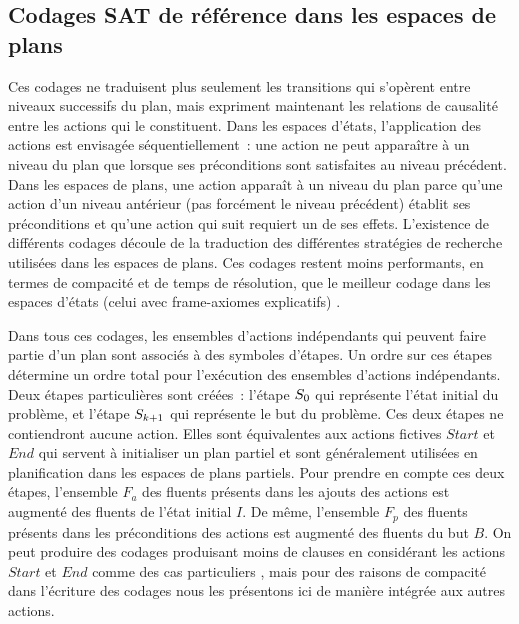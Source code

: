 %
%
\subsection{Codages SAT de référence dans les espaces de plans}


{\color{red}
Ces codages ne traduisent plus seulement les transitions qui s'opèrent entre niveaux successifs du plan, mais expriment maintenant les relations de causalité entre les actions qui le constituent. Dans les espaces d'états, l'application des actions est envisagée séquentiellement~: une action ne peut apparaître à un niveau du plan que lorsque ses préconditions sont satisfaites au niveau précédent.  Dans les espaces de plans, une action apparaît à un niveau du plan parce qu'une action d'un niveau antérieur (pas forcément le niveau précédent) établit ses préconditions et qu'une action qui suit requiert un de ses effets.
L'existence de différents codages découle de la traduction des différentes
stratégies de recherche utilisées dans les espaces de plans. Ces codages restent moins performants, en termes de compacité et de temps de résolution, que le meilleur codage dans les espaces d'états (celui avec frame-axiomes explicatifs)
\cite{MK99}.

Dans tous ces codages, les ensembles d'actions indépendants qui peuvent faire partie d'un plan sont associés à des symboles d'étapes. Un ordre sur ces étapes détermine un ordre total pour l'exécution des ensembles d'actions indépendants.
Deux étapes particulières sont créées~: l'étape $S_{0}$ qui représente l'état initial du problème, et l'étape $S_{k+1}$ qui représente le but du problème. Ces deux étapes ne contiendront aucune action. Elles sont équivalentes aux actions fictives $Start$ et $End$ qui servent à initialiser un plan partiel et sont généralement utilisées en planification dans les espaces de plans partiels. Pour prendre en
compte ces deux étapes, l'ensemble $F_a$ des fluents présents dans les ajouts des actions est augmenté des fluents de l'état initial $I$. De même, l'ensemble $F_p$ des fluents présents dans les préconditions des actions est augmenté des fluents du but $B$. On peut produire des codages produisant moins de clauses en considérant les actions $Start$ et $End$ comme des cas particuliers \cite{Vid01}, mais pour des raisons de compacité dans l'écriture des codages nous les présentons ici de manière intégrée aux autres actions.

}
